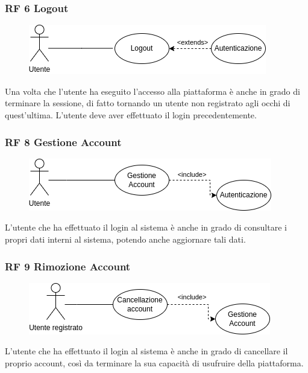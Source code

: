 \documentclass{article}
\begin{document}
\clearpage

\subsubsection{RF 6 Logout}\label{rf_6}
\begin{description}
	
	\begin{figure}[htp]
		\centering
		\includegraphics[]{rf6.png}
	\end{figure}
	
	\item Una volta che l'utente ha eseguito l'accesso alla piattaforma è anche in grado di terminare la sessione, di fatto tornando un utente non registrato agli occhi di quest'ultima. L'utente deve aver effettuato il login precedentemente. 
\end{description}

\subsubsection{RF 8 Gestione Account}\label{rf_8}
\begin{description}
	
	\begin{figure}[htp]
		\centering
		\includegraphics[]{rf8.png}
	\end{figure}	
		
	\item L'utente che ha effettuato il login al sistema è anche in grado di consultare i propri dati interni al sistema, potendo anche aggiornare tali dati.
\end{description}

\subsubsection{RF 9 Rimozione Account}\label{rf_9}
\begin{description}
	
	\begin{figure}[htp]
		\centering
		\includegraphics[]{rf9.png}
	\end{figure}
	
	\item L'utente che ha effettuato il login al sistema è anche in grado di cancellare il proprio account, così da terminare la sua capacità di usufruire della piattaforma.
\end{description}
\end{document}
